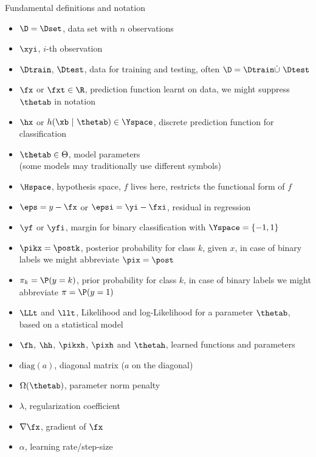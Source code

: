 \begin{vbframe}{Fundamental definitions and notation}
\begin{itemize}
\item $\D = \Dset$, data set with $n$ observations
\item $\xyi$, $i$-th observation
\item $\Dtrain$, $\Dtest$, data for training and testing, often $\D = \Dtrain \dot{\cup} ~ \Dtest$
  \item $\fx$ or $\fxt \in \R$, prediction function learnt on data, we might suppress $\thetab$ in notation
\item $\hx$ or $h(\xb ~|~\thetab) \in \Yspace$, discrete prediction function for classification
\item $\thetab \in \Theta$, model parameters\\
(some models may traditionally use different symbols)
\item $\Hspace$, hypothesis space, $f$ lives here, restricts the functional form of $f$
  \item $\eps = y - \fx$ or $\epsi = \yi - \fxi$, residual in regression
\item $\yf$ or $\yfi$, margin for binary classification with  $\Yspace = \{-1, 1\}$
  \end{itemize}

\framebreak

\begin{itemize}
\item $\pikx = \postk$, posterior probability for class $k$, given $x$, in case of binary labels we might abbreviate
$\pix = \post$
  \item $\pi_k = \P(y = k)$, prior probability for class $k$, in case of binary labels we might abbreviate
$\pi = \P(y = 1)$
  \item $\LLt$ and $\llt$, Likelihood and log-Likelihood for a parameter $\thetab$, based on a statistical model
\item $\fh$, $\hh$, $\pikxh$, $\pixh$ and $\thetah$, learned functions and parameters
  \item $\text{diag}(a)$, diagonal matrix ($a$ on the diagonal)
  \item $\Omega(\thetab)$, parameter norm penalty
  \item $\lambda$, regularization coefficient
  \item $\nabla \fx$, gradient of $\fx$
  \item $\alpha$, learning rate/step-size



\end{itemize}
\end{vbframe}
